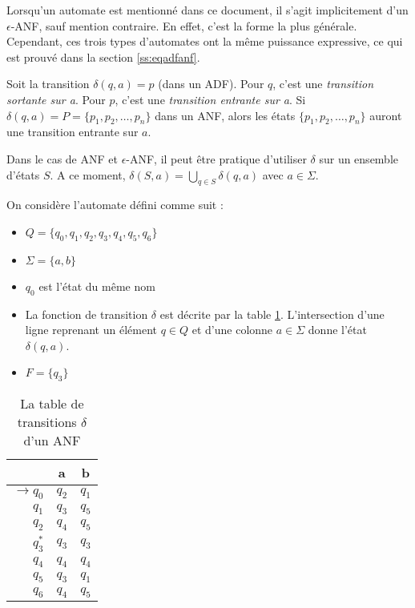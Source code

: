 Lorsqu'un automate est mentionné dans ce document, il s'agit implicitement d'un $\epsilon$-ANF, sauf mention contraire. En effet, c'est la forme la plus générale. Cependant, ces trois types d'automates ont la même puissance expressive, ce qui est prouvé dans la section \ref{ss:eqadfanf}.

Soit la transition $\delta(q,a)=p$ (dans un ADF). Pour $q$, c'est une \emph{transition sortante sur a}. Pour $p$, c'est une \emph{transition entrante sur a}. Si $\delta(q,a)=P=\{p_1,p_2,\dots,p_n\}$ dans un ANF, alors les états $\{p_1,p_2,\dots,p_n\}$ auront une transition entrante sur $a$.

Dans le cas de ANF et $\epsilon$-ANF, il peut être pratique d'utiliser $\delta$ sur un ensemble d'états $S$. A ce moment, $\delta(S,a)=\bigcup_{q\in S}\delta(q,a)$ avec $a\in \Sigma$.




\begin{example}\label{ex:adf}
  On considère l'automate \automaton défini comme suit :
  \begin{itemize}
    \item $Q=\{q_0,q_1,q_2,q_3,q_4,q_5,q_6\}$
    \item $\Sigma=\{a,b\}$
    \item $q_0$ est l'état du même nom
    \item La fonction de transition $\delta$ est décrite par la table \ref{table:transdelta}. L'intersection d'une ligne reprenant un élément $q \in Q$ et d'une colonne $a \in \Sigma$ donne l'état $\delta(q,a)$.
    \item $F=\{q_3\}$
  \end{itemize}

  \begin{table}[H]
    \centering
    \begin{tabular}{|r||c|c|}
      \hline
      &a&b\\
      \hline\hline
      $\rightarrow q_0$&$q_2$&$q_1$\\\hline
      $q_1$&$q_3$&$q_5$\\\hline
      $q_2$&$q_4$&$q_5$\\\hline
      $q_3^*$&$q_3$&$q_3$\\\hline
      $q_4$&$q_4$&$q_4$\\\hline
      $q_5$&$q_3$&$q_1$\\\hline
      $q_6$&$q_4$&$q_5$\\\hline
    \end{tabular}
    \caption{La table de transitions $\delta$ d'un ANF}
    \label{table:transdelta}
  \end{table}
\end{example}

